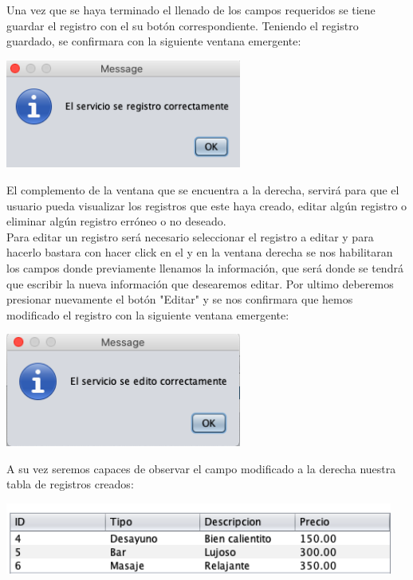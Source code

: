 \documentclass[12pt]{article}
\begin{document}
\begin{flushleft}
\vspace{0.5cm}
\textsf{Una vez que se haya terminado el llenado de los campos requeridos se tiene guardar el registro con el su botón correspondiente. Teniendo el registro guardado, se confirmara con la siguiente ventana emergente: }
\vspace{0.5cm}
\begin{center}
\includegraphics[width=7.75cm]{9.png}
\end{center}
\textsf{El complemento de la ventana que se encuentra a la derecha, servirá para que el usuario pueda visualizar los registros que este haya creado, editar algún registro o eliminar algún registro erróneo o no deseado.\vspace{0.5cm} \\Para editar un registro será necesario seleccionar el registro a editar y para hacerlo bastara con hacer click en el y en la ventana derecha se nos habilitaran  los campos donde previamente llenamos la información, que será donde se tendrá que escribir la nueva información que desearemos editar. Por ultimo deberemos presionar nuevamente el botón "Editar" y se nos confirmara que hemos modificado el registro con la siguiente ventana emergente: }
\vspace{0.5cm}
\begin{center}
\includegraphics[width=7.75cm]{10.png}
\end{center}
\textsf{A su vez seremos capaces de observar el campo modificado a la derecha nuestra tabla de registros creados: }
\vspace{0.5cm}
\begin{center}
\includegraphics[width=12.75cm]{11.png}

\end{center}
\end{flushleft}
\end{document}
